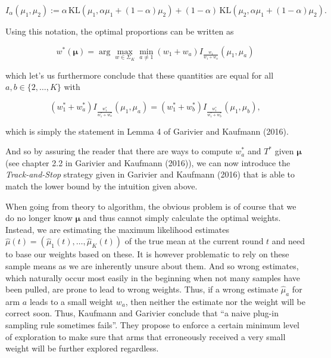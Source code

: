 \documentclass[12pt,]{article}
\newcommand{\KL}{\,\text{KL}}
\begin{document}
\begin{equation*}
I_{\alpha}(\mu_1, \mu_2) := \alpha \KL(\mu_1, \alpha \mu_1 + (1-\alpha) \mu_2) + (1-\alpha) \KL(\mu_2, \alpha \mu_1 + (1-\alpha) \mu_2).
\end{equation*}

Using this notation, the optimal proportions can be written as

\begin{equation*}
w^*(\bm{\mu}) = \arg \max_{w \in \Sigma_K} \min_{a \neq 1} (w_1 + w_a) I_{\frac{w_1}{w_1+w_a}}(\mu_1, \mu_a)
\end{equation*}

which let's us furthermore conclude that these quantities are equal for
all \(a,b \in \{2,\dots, K\}\) with

\begin{equation*}
(w_1^* + w_a^*) I_{\frac{w_1^*}{w_1^*+w_a^*}}(\mu_1, \mu_a) = (w_1^* + w_b^*) I_{\frac{w_1^*}{w_1^*+w_b^*}}(\mu_1, \mu_b),
\end{equation*}

which is simply the statement in Lemma 4 of Garivier and Kaufmann
(2016).

And so by assuring the reader that there are ways to compute \(w_a^*\)
and \(T^*\) given \(\bm{\mu}\) (see chapter 2.2 in Garivier and Kaufmann
(2016)), we can now introduce the \emph{Track-and-Stop} strategy given
in Garivier and Kaufmann (2016) that is able to match the lower bound by
the intuition given above.

When going from theory to algorithm, the obvious problem is of course
that we do no longer know \(\bm{\mu}\) and thus cannot simply calculate
the optimal weights. Instead, we are estimating the maximum likelihood
estimates \(\hat{\mu}(t) = (\hat{\mu}_1(t), \dots, \hat{\mu}_K(t))\) of
the true mean at the current round \(t\) and need to base our weights
based on these. It is however problematic to rely on these sample means
as we are inherently unsure about them. And so wrong estimates, which
naturally occur most easily in the beginning when not many samples have
been pulled, are prone to lead to wrong weights. Thus, if a wrong
estimate \(\hat{\mu}_a\) for arm \(a\) leads to a small weight \(w_a\),
then neither the estimate nor the weight will be correct soon. Thus,
Kaufmann and Garivier conclude that ``a naive plug-in sampling rule
sometimes fails''. They propose to enforce a certain minimum level of
exploration to make sure that arms that erroneously received a very
small weight will be further explored regardless.
\end{document}
